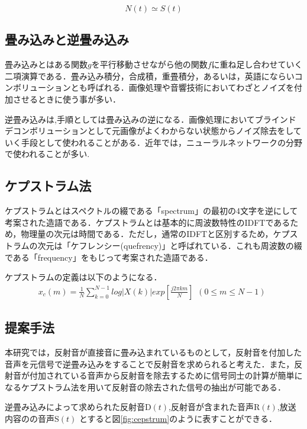 \documentclass[a4j,11pt]{jsarticle}
\begin{document}
\begin{equation}
  N(t)\simeq S(t)
\end{equation}


\subsection{畳み込みと逆畳み込み}
畳み込みとはある関数$g$を平行移動させながら他の関数$f$に重ね足し合わせていく二項演算である．畳み込み積分，合成積，重畳積分，あるいは，英語にならいコンボリューションとも呼ばれる．画像処理や音響技術においてわざとノイズを付加させるときに使う事が多い．

逆畳み込みは,手順としては畳み込みの逆になる．画像処理においてブラインドデコンボリューションとして元画像がよくわからない状態からノイズ除去をしていく手段として使われることがある．近年では，ニューラルネットワークの分野で使われることが多い.
\subsection{ケプストラム法}
ケプストラムとはスペクトルの綴である「spectrum」の最初の4文字を逆にして考案された造語である．ケプストラムとは基本的に周波数特性のIDFTであるため，物理量の次元は時間である．ただし，通常のIDFTと区別するため，ケプストラムの次元は「ケフレンシー(quefrency)」と呼ばれている．これも周波数の綴である「frequency」をもじって考案された造語である\cite{oka4}．

ケプストラムの定義は以下のようになる．
\begin{eqnarray*}
 x_{c}(m) = \frac{1}{N}\sum^{N-1}_{k=0} log|X(k)|exp[\frac{j2\pi km}{N}]   
 \begin{array}{l}
 (0 \leq m \leq N-1)
 \end{array}
\end{eqnarray*}

\newpage

\subsection{提案手法}
本研究では，反射音が直接音に畳み込まれているものとして，反射音を付加した音声を元信号で逆畳み込みをすることで反射音を求められると考えた．また，反射音が付加されている音声から反射音を除去するために信号同士の計算が簡単になるケプストラム法を用いて反射音の除去された信号の抽出が可能である．

逆畳み込みによって求められた反射音D$(t)$,反射音が含まれた音声R$(t)$,放送内容のの音声S$(t)$
とすると図\ref{fig:cepstrum}のように表すことができる．
\end{document}

